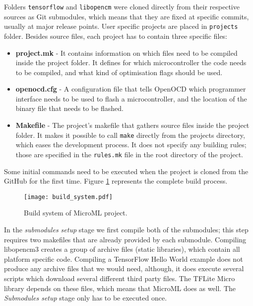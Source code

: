 Folders \verb|tensorflow| and \verb|libopencm| were cloned directly from their respective sources as Git submodules, which means that they are fixed at specific commits, usually at major release points.
User specific projects are placed in \verb|projects| folder.
Besides source files, each project has to contain three specific files:
\newline
\begin{itemize}
    \item \textbf{project.mk} - It contains information on which files need to be compiled inside the project folder. It defines for which microcontroller the code needs to be compiled, and what kind of optimisation flags should be used.
    \item \textbf{openocd.cfg} - A configuration file that tells OpenOCD which programmer interface needs to be used to flash a microcontroller, and the location of the binary file that needs to be flashed.
    \item \textbf{Makefile} - The project's makefile that gathers source files inside the project folder. It makes it possible to call \verb|make| directly from the projects directory, which eases the development process. It does not specify any building rules; those are specified in the \verb|rules.mk| file in the root directory of the project.
\end{itemize}
Some initial commands need to be executed when the project is cloned from the GitHub for the first time. 
Figure \ref{build_system} represents the complete build process.
\newline
\begin{figure}[ht]
        \centering
        \texttt{[image: build\_system.pdf]} 
        \caption{ Build system of MicroML project.} 
        \label{build_system}
\end{figure}
\clearpage
In the \textit{submodules setup} stage we first compile both of the submodules; this step requires two makefiles that are already provided by each submodule.
Compiling libopencm3 creates a group of archive files (static libraries), which contain all platform specific code.
Compiling a TensorFlow Hello World example does not produce any archive files that we would need, although, it does execute several scripts which download several different third party files.
The TFLite Micro library depends on these files, which means that MicroML does as well.
The \textit{Submodules setup} stage only has to be executed once.

